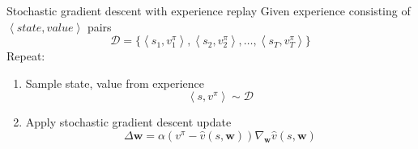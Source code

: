 \bgroup
\begin{frame}{Stochastic gradient descent with experience replay}
Given experience consisting of $\left<state,value\right>$ pairs
\begin{equation*}
\mathcal{D}=\{\left<s_1,v_1^{\pi}\right>,
\left<s_2,v_2^{\pi}\right>,
\ldots,
\left<s_T,v_T^{\pi}\right>\}
\end{equation*}
Repeat:
\begin{enumerate}
\item Sample state, value from experience
\begin{equation*}
\left<s, v^{\pi}\right>\sim\mathcal{D}
\end{equation*}
\item Apply stochastic gradient descent update
\begin{equation*}
\Delta \textbf{w}=\alpha(v^{\pi}-\hat{v}(s,\textbf{w}))\nabla_{\textbf{w}}\hat{v}(s, \textbf{w})
\end{equation*}
\end{enumerate}
\end{frame}
\egroup